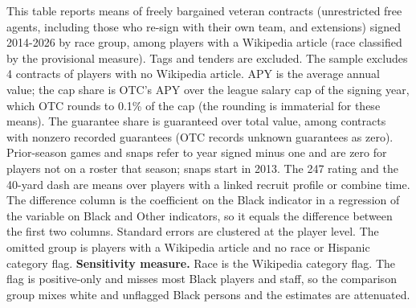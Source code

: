 \begin{table}[!h]
{\begin{threeparttable}
\begin{tablenotes}[para]
\item This table reports means of freely bargained veteran contracts (unrestricted free agents, including those who re-sign with their own team, and extensions) signed 2014-2026 by race group, among players with a Wikipedia article (race classified by the provisional measure). Tags and tenders are excluded. The sample excludes 4 contracts of players with no Wikipedia article. APY is the average annual value; the cap share is OTC's APY over the league salary cap of the signing year, which OTC rounds to 0.1\% of the cap (the rounding is immaterial for these means). The guarantee share is guaranteed over total value, among contracts with nonzero recorded guarantees (OTC records unknown guarantees as zero). Prior-season games and snaps refer to year signed minus one and are zero for players not on a roster that season; snaps start in 2013. The 247 rating and the 40-yard dash are means over players with a linked recruit profile or combine time. The difference column is the coefficient on the Black indicator in a regression of the variable on Black and Other indicators, so it equals the difference between the first two columns. Standard errors are clustered at the player level. The omitted group is players with a Wikipedia article and no race or Hispanic category flag. \textbf{Sensitivity measure.} Race is the Wikipedia category flag. The flag is positive-only and misses most Black players and staff, so the comparison group mixes white and unflagged Black persons and the estimates are attenuated.
\end{tablenotes}
\end{threeparttable}}
\end{table}
